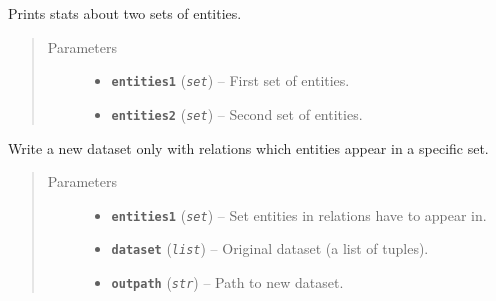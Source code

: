 \documentclass[letterpaper,10pt,english]{sphinxmanual}
\begin{document}
\begin{fulllineitems}
\label{src.trans_e:src.trans_e.contains_entities.contains_entities}
Prints stats about two sets of entities.
\begin{quote}\begin{description}
\item[{Parameters}] \leavevmode\begin{itemize}
\item {} 
\textbf{\texttt{entities1}} (\emph{\texttt{set}}) -- First set of entities.

\item {} 
\textbf{\texttt{entities2}} (\emph{\texttt{set}}) -- Second set of entities.

\end{itemize}

\end{description}\end{quote}

\end{fulllineitems}


\begin{fulllineitems}
\label{src.trans_e:src.trans_e.contains_entities.create_new_dataset}
Write a new dataset only with relations which entities appear in a specific set.
\begin{quote}\begin{description}
\item[{Parameters}] \leavevmode\begin{itemize}
\item {} 
\textbf{\texttt{entities1}} (\emph{\texttt{set}}) -- Set entities in relations have to appear in.

\item {} 
\textbf{\texttt{dataset}} (\emph{\texttt{list}}) -- Original dataset (a list of tuples).

\item {} 
\textbf{\texttt{outpath}} (\emph{\texttt{str}}) -- Path to new dataset.

\end{itemize}

\end{description}\end{quote}

\end{fulllineitems}
\end{document}

